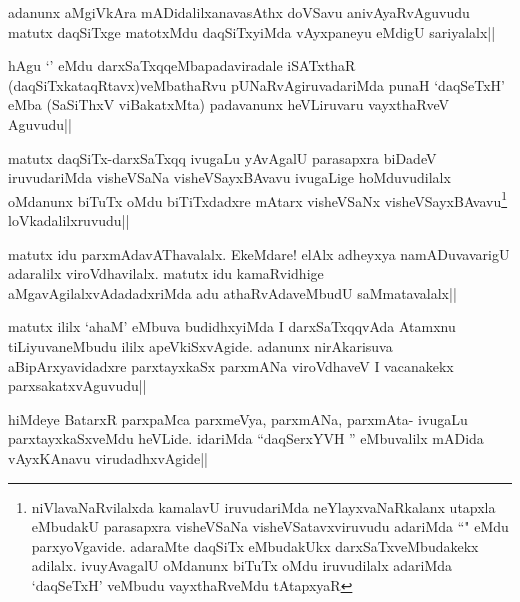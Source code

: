 \begin{artha}
adanunx aMgiVkAra mADidalilx\footnotemark[2] anavasAthx doVSavu anivAyaRvAguvudu matutx daqSiTxge matotxMdu daqSiTxyiMda vAyxpaneyu eMdigU sariyalalx||
\end{artha}

\begin{artha}%
hAgu `\stext ' eMdu darxSaTxqqeMbapadaviradale iSATxthaR (daqSiTxkataqRtavx)veMbathaRvu pUNaRvAgiruvadariMda punaH `daqSeTxH' eMba (SaSiThxV viBakatxMta) padavanunx heVLiruvaru vayxthaRveV Aguvudu||
\end{artha}


\begin{artha}
matutx daqSiTx-darxSaTxqq ivugaLu yAvAgalU parasapxra biDadeV iruvudariMda visheVSaNa visheVSayxBAvavu ivugaLige hoMduvudilalx oMdanunx biTuTx oMdu biTiTxdadxre mAtarx visheVSaNx visheVSayxBAvavu\footnote[1]{niVlavaNaRvilalxda kamalavU iruvudariMda neYlayxvaNaRkalanx utapxla eMbudakU parasapxra visheVSaNa visheVSatavxviruvudu adariMda ``\stext " eMdu parxyoVgavide. adaraMte daqSiTx eMbudakUkx darxSaTxveMbudakekx adilalx. ivuyAvagalU oMdanunx biTuTx oMdu iruvudilalx adariMda `daqSeTxH' veMbudu vayxthaRveMdu tAtapxyaR} loVkadalilxruvudu||
\end{artha}

\begin{artha}
matutx idu parxmAdavAThavalalx. EkeMdare! elAlx adheyxya namADuvavarigU adaralilx viroVdhavilalx. matutx idu kamaRvidhige aMgavAgilalxvAdadadxriMda adu athaRvAdaveMbudU saMmatavalalx||
\end{artha}


\begin{artha}
matutx ililx `ahaM' eMbuva budidhxyiMda I darxSaTxqqvAda Atamxnu tiLiyuvaneMbudu ililx apeVkiSxvAgide. adanunx nirAkarisuva aBipArxyavidadxre parxtayxkaSx parxmANa viroVdhaveV I vacanakekx parxsakatxvAguvudu||
\end{artha}

\begin{artha}
hiMdeye BatarxR parxpaMca parxmeVya, parxmANa, parxmAta- ivugaLu parxtayxkaSxveMdu heVLide. idariMda ``daqSerxYVH '' eMbuvalilx mADida vAyxKAnavu virudadhxvAgide||
\end{artha}

